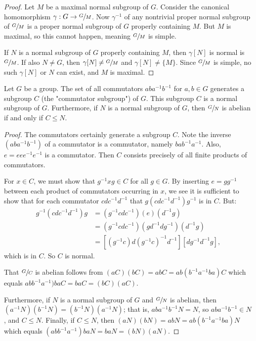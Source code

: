 \documentclass[a4paper,8]{article}
\begin{document}
\begin{outline}
    \begin{proof}
      \forward
        Let \(M\) be a maximal normal subgroup of \(G\). Consider the canonical homomorphism
        \(\gamma: G \rightarrow \sfrac{G}{M}\). Now \(\gamma^{-1}\) of any nontrivial proper normal
        subgroup of \(\sfrac{G}{M}\) is a proper normal subgroup of \(G\) properly containing \(M\).
        But \(M\) is maximal, so this cannot happen, meaning \(\sfrac{G}{M}\) is simple.

      \backward
        If \(N\) is a normal subgroup of \(G\) properly containing \(M\), then \(\gamma[N]\) is normal is
        \(\sfrac{G}{M}\). If also \(N \neq G\), then \(\gamma[N] \neq \sfrac{G}{M}\) and \(\gamma[N] \neq
        \{M\}\). Since \(\sfrac{G}{M}\) is simple, no such \(\gamma[N]\) or \(N\) can exist, and \(M\) is maximal.
    \end{proof}

    Let \(G\) be a group. The set of all commutators \(aba^{-1}b^{-1}\) for \(a, b \in G\)
    generates a subgroup \(C\) (the "commutator subgroup") of \(G\). This subgroup \(C\) is a normal subgroup of
    \(G\). Furthermore, if \(N\) is a normal subgroup of \(G\), then \(\sfrac{G}{N}\) is abelian if and only if
    \(C \leq N\).

    \begin{proof}
      The commutators certainly generate a subgroup \(C\). Note the inverse \((aba^{-1}b^{-1})\) of a commutator is
      a commutator, namely \(bab^{-1}a^{-1}\). Also, \(e = eee^{-1}e^{-1}\) is a commutator. Then \(C\) consists
      precisely of all finite products of commutators.

      For \(x \in C\), we must show that \(g^{-1}xg \in C\) for all \(g \in G\). By
      inserting \(e = gg^{-1}\) between each product of commutators occurring in \(x\), we see it is sufficient to show
      that for each commutator \(cdc^{-1}d^{-1}\) that \(g(cdc^{-1}d^{-1})g^{-1}\) is in \(C\). But:
      \begin{align*}
        g^{-1}(cdc^{-1}d^{-1})g &= (g^{-1}cdc^{-1})(e)(d^{-1}g) \\
                                &= (g^{-1}cdc^{-1})(gd^{-1}dg^{-1})(d^{-1}g)\\
                                &= [(g^{-1}c)d(g^{-1}c)^{-1}d^{-1}][dg^{-1}d^{-1}g],
      \end{align*}
      which is in \(C\). So \(C\) is normal.

      That \(\sfrac{G}{C}\) is abelian follows from \((aC)(bC) = abC = ab(b^{-1}a^{-1}ba)C\) which equals
      \(abb^{-1}a^{-1})baC = baC = (bC)(aC).\)

      Furthermore, if \(N\) is a normal subgroup of \(G\) and \(\sfrac{G}{N}\) is abelian, then
      \((a^{-1}N)(b^{-1}N) = (b^{-1}N)(a^{-1}N)\); that is, \(aba^{-1}b^{-1}N = N\), so \(aba^{-1}b^{-1} \in N\),
      and \(C \leq N\). Finally, if \(C \leq N\), then \((aN)(bN) = abN = ab(b^{-1}a^{-1}ba)N\) which equals
      \((abb^{-1}a^{-1})baN = baN = (bN)(aN).\)
    \end{proof}

\end{outline}
\end{document}
